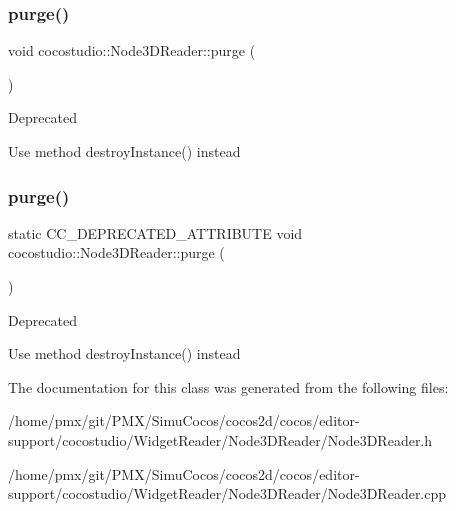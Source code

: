 \subsubsection{\texorpdfstring{purge()}{purge()}\hspace{0.1cm}{\footnotesize\ttfamily [1/2]}}
{\footnotesize\ttfamily void cocostudio\+::\+Node3\+D\+Reader\+::purge (\begin{DoxyParamCaption}{ }\end{DoxyParamCaption})\hspace{0.3cm}{\ttfamily [static]}}

\begin{DoxyRefDesc}{Deprecated}
\item[\hyperlink{deprecated__deprecated000094}{Deprecated}]Use method destroy\+Instance() instead \end{DoxyRefDesc}
\mbox{\label{classcocostudio_1_1Node3DReader_a72927cdd6534faa8df31fd9337bf6956}} 
\subsubsection{\texorpdfstring{purge()}{purge()}\hspace{0.1cm}{\footnotesize\ttfamily [2/2]}}
{\footnotesize\ttfamily static C\+C\+\_\+\+D\+E\+P\+R\+E\+C\+A\+T\+E\+D\+\_\+\+A\+T\+T\+R\+I\+B\+U\+TE void cocostudio\+::\+Node3\+D\+Reader\+::purge (\begin{DoxyParamCaption}{ }\end{DoxyParamCaption})\hspace{0.3cm}{\ttfamily [static]}}

\begin{DoxyRefDesc}{Deprecated}
\item[\hyperlink{deprecated__deprecated000329}{Deprecated}]Use method destroy\+Instance() instead \end{DoxyRefDesc}


The documentation for this class was generated from the following files\+:\begin{DoxyCompactItemize}
\item 
/home/pmx/git/\+P\+M\+X/\+Simu\+Cocos/cocos2d/cocos/editor-\/support/cocostudio/\+Widget\+Reader/\+Node3\+D\+Reader/Node3\+D\+Reader.\+h\item 
/home/pmx/git/\+P\+M\+X/\+Simu\+Cocos/cocos2d/cocos/editor-\/support/cocostudio/\+Widget\+Reader/\+Node3\+D\+Reader/Node3\+D\+Reader.\+cpp\end{DoxyCompactItemize}
